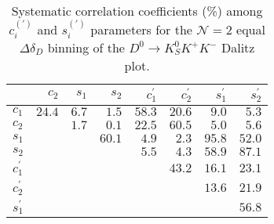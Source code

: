 \documentclass[aps,prd,superscriptaddress,nopreprintnumbers,nofootinbib,showpacs,floatfix]{revtex4}
\begin{document}
\begin{table}[htb]
\caption{Systematic correlation coefficients (\%) among $c^{(\prime)}_{i}$ and $s^{(\prime)}_{i}$ parameters for %
the $\mathcal{N}=2$ equal $\Delta\delta_D$ binning of the $D^{0}\to K^{0}_{S}K^{+}K^{-}$ Dalitz %
plot.}\label{tab:corr_K0SKK_2bin_syst}
\begin{center} 
\begin{tabular}{lrrrrrrr} \hline\hline
               & $c_2 $ & $s_1$ & $s_2$ & $c^{\prime}_1$ & $c^{\prime}_2$ & $s^{\prime}_1$ & $s^{\prime}_2$ \\ %
\hline
$c_1$          & $  24.4 $  & $  6.7 $   & $  1.5 $   & $  58.3 $  & $  20.6 $  & $  9.0 $   & $  5.3 $ \\ 
$c_2$          &            & $  1.7 $   & $  0.1 $   & $  22.5 $  & $  60.5 $  & $  5.0 $   & $  5.6 $ \\ 
$s_1$          &            &            & $  60.1 $  & $  4.9 $   & $  2.3 $   & $  95.8 $  & $  52.0 $ \\
$s_2$          &            &            &            & $  5.5 $   & $  4.3 $   & $  58.9 $  & $  87.1 $ \\
$c^{\prime}_1$ &            &            &            &            & $  43.2 $  & $  16.1 $  & $  23.1 $ \\
$c^{\prime}_2$ &            &            &            &            &            & $  13.6 $  & $  21.9 $ \\
$s^{\prime}_1$ &            &            &            &            &            &            & $  56.8 $ \\
\hline\hline
\end{tabular}
\end{center}
\end{table}
\end{document}
